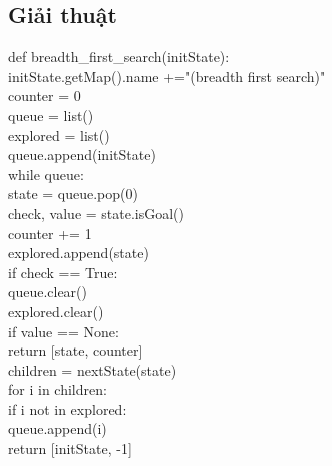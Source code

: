\documentclass[11pt,a4paper]{article}
\begin{document}
\subsection{Giải thuật}
\begin{flushleft}
	\hspace{2 cm}	def breadth\_first\_search(initState):\\
	\hspace{3 cm}	initState.getMap().name +="(breadth first search)"\\
	\hspace{3 cm}	counter = 0\\
	\hspace{3 cm}	queue = list()\\
	\hspace{3 cm}	explored = list()\\
	\hspace{3 cm}	queue.append(initState)\\
	\hspace{3 cm}	while queue:\\
	\hspace{4 cm}	state = queue.pop(0)\\
	\hspace{4 cm}	check, value = state.isGoal()\\
	\hspace{4 cm}	counter += 1\\
	\hspace{4 cm}	explored.append(state)\\
	\hspace{4 cm}	if check == True:\\
	\hspace{5 cm}	queue.clear()\\
	\hspace{5 cm}	explored.clear()\\
	\hspace{5 cm}	if value == None:\\
	\hspace{6 cm}	return [state, counter]\\
	\hspace{4 cm}	children = nextState(state)\\
	\hspace{4 cm}	for i in children:\\
	\hspace{5 cm}	if i not in explored:\\
	\hspace{6 cm}	queue.append(i)\\
	\hspace{3 cm}	return [initState, -1]\\
\end{flushleft}
\newpage
\end{document}
